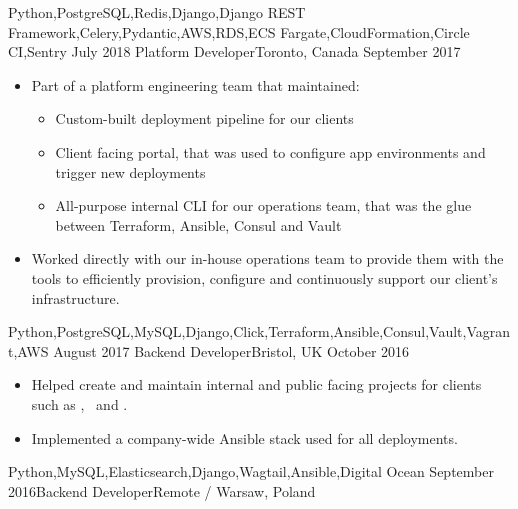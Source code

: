 \documentclass[localFont,alternative,10pt]{yaac-another-awesome-cv}
\begin{document}
\begin{experiences}
                      {Python,PostgreSQL,Redis,Django,Django REST Framework,Celery,Pydantic,AWS,RDS,ECS Fargate,CloudFormation,Circle CI,Sentry}
    \emptySeparator
    \experience
      {July 2018}     {Platform Developer}{}{Toronto, Canada}
      {September 2017}{
                        \begin{itemize}
                          \item Part of a platform engineering team that maintained:
                            \begin{itemize}
                              \item Custom-built deployment pipeline for our clients
                              \item Client facing portal, that was used to configure app environments and trigger new deployments
                              \item All-purpose internal CLI for our operations team, that was the glue between Terraform, Ansible, Consul and Vault
                            \end{itemize}
                          \item Worked directly with our in-house operations team to provide them with the tools to efficiently provision, configure and continuously support our client's infrastructure.
                        \end{itemize}
                      }
                      {Python,PostgreSQL,MySQL,Django,Click,Terraform,Ansible,Consul,Vault,Vagrant,AWS}
    \emptySeparator
    \experience
      {August 2017}   {Backend Developer}{}{Bristol, UK}
      {October 2016}  {
                        \begin{itemize}
                          \item Helped create and maintain internal and public facing projects for clients such as , ~and .
                          \item Implemented a company-wide Ansible stack used for all deployments.
                        \end{itemize}
                      }
                      {Python,MySQL,Elasticsearch,Django,Wagtail,Ansible,Digital Ocean}
    \emptySeparator
    \experience
      {September 2016}{Backend Developer}{}{Remote / Warsaw, Poland}

\end{experiences}
\end{document}
